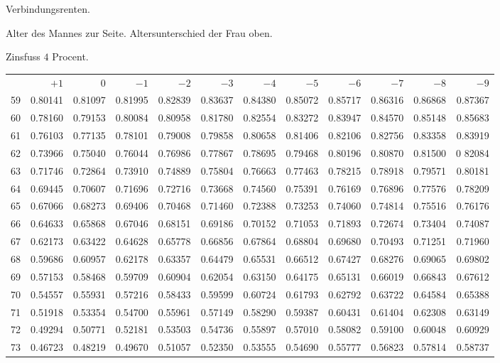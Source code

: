 \clearpage
{}
\begin{center}
Verbindungsrenten.\par\smallskip
Alter des Mannes zur Seite. Altersunterschied der Frau oben.\par\smallskip
Zinsfuss \(4\) Procent.\par\medskip
\fontsize{8}{10}\selectfont\setlength{\tabcolsep}{1.3pt}
\begin{tabular}{|r|rrrrrrrrrrr|}
\hline
&\(+1\)&0&\(-1\)&\(-2\)&\(-3\)&\(-4\)&\(-5\)&\(-6\)&\(-7\)&\(-8\)&\(-9\)\\[8pt]
59&0.80141&0.81097&0.81995&0.82839&0.83637&0.84380&0.85072&0.85717&0.86316&0.86868&0.87367\\
60&0.78160&0.79153&0.80084&0.80958&0.81780&0.82554&0.83272&0.83947&0.84570&0.85148&0.85683\\
61&0.76103&0.77135&0.78101&0.79008&0.79858&0.80658&0.81406&0.82106&0.82756&0.83358&0.83919\\
62&0.73966&0.75040&0.76044&0.76986&0.77867&0.78695&0.79468&0.80196&0.80870&0.81500&0 82084\\
63&0.71746&0.72864&0.73910&0.74889&0.75804&0.76663&0.77463&0.78215&0.78918&0.79571&0.80181\\
64&0.69445&0.70607&0.71696&0.72716&0.73668&0.74560&0.75391&0.76169&0.76896&0.77576&0.78209\\[5pt]
65&0.67066&0.68273&0.69406&0.70468&0.71460&0.72388&0.73253&0.74060&0.74814&0.75516&0.76176\\
66&0.64633&0.65868&0.67046&0.68151&0.69186&0.70152&0.71053&0.71893&0.72674&0.73404&0.74087\\
67&0.62173&0.63422&0.64628&0.65778&0.66856&0.67864&0.68804&0.69680&0.70493&0.71251&0.71960\\
68&0.59686&0.60957&0.62178&0.63357&0.64479&0.65531&0.66512&0.67427&0.68276&0.69065&0.69802\\
69&0.57153&0.58468&0.59709&0.60904&0.62054&0.63150&0.64175&0.65131&0.66019&0.66843&0.67612\\[5pt]
70&0.54557&0.55931&0.57216&0.58433&0.59599&0.60724&0.61793&0.62792&0.63722&0.64584&0.65388\\
71&0.51918&0.53354&0.54700&0.55961&0.57149&0.58290&0.59387&0.60431&0.61404&0.62308&0.63149\\
72&0.49294&0.50771&0.52181&0.53503&0.54736&0.55897&0.57010&0.58082&0.59100&0.60048&0.60929\\
73&0.46723&0.48219&0.49670&0.51057&0.52350&0.53555&0.54690&0.55777&0.56823&0.57814&0.58737\\

\end{tabular}
\end{center}

